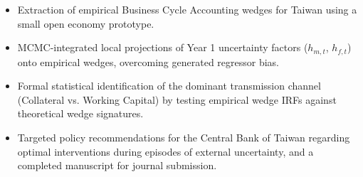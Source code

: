 %
\begin{itemize}
    \item Extraction of empirical Business Cycle Accounting wedges for Taiwan using a small open economy prototype.
    \item MCMC-integrated local projections of Year 1 uncertainty factors ($h_{m,t}$, $h_{f,t}$) onto empirical wedges, overcoming generated regressor bias.
    \item Formal statistical identification of the dominant transmission channel (Collateral vs. Working Capital) by testing empirical wedge IRFs against theoretical wedge signatures.
    \item Targeted policy recommendations for the Central Bank of Taiwan regarding optimal interventions during episodes of external uncertainty, and a completed manuscript for journal submission.
\end{itemize}